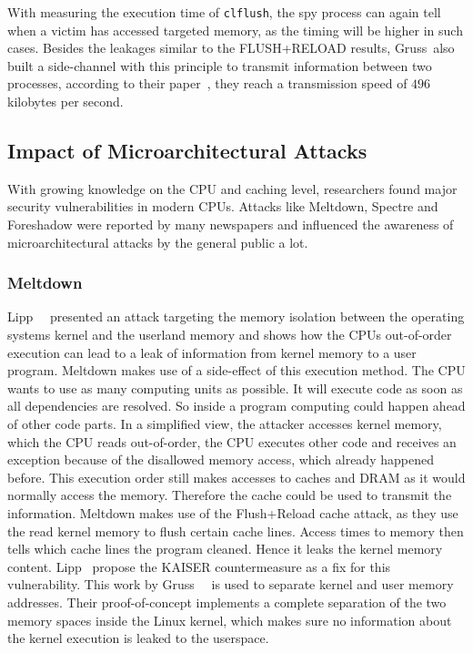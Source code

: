 With measuring the execution time of \texttt{clflush}, the spy process can again
tell when a victim has accessed targeted memory, as the timing will be higher in
such cases. Besides the leakages similar to the FLUSH+RELOAD results,
Gruss~\etal also built a side-channel with this principle to transmit
information between two processes, according to their paper~\cite{flushflush},
they reach a transmission speed of $496$ kilobytes per second.

\subsection{Impact of Microarchitectural Attacks}

With growing knowledge on the CPU and caching level, researchers found major
security vulnerabilities in modern CPUs. Attacks like Meltdown, Spectre and
Foreshadow were reported by many newspapers and influenced the awareness of
microarchitectural attacks by the general public a lot.

\subsubsection{Meltdown}

Lipp~\etal~\cite{meltdown} presented an attack targeting the memory isolation
between the operating system\textquotesingle s kernel and the userland memory
and shows how the CPU\textquotesingle s out-of-order execution can lead to a
leak of information from kernel memory to a user program. Meltdown makes use of
a side-effect of this execution method. The CPU wants to use as many computing
units as possible. It will execute code as soon as all dependencies are
resolved. So inside a program computing could happen ahead of other code parts.
In a simplified view, the attacker accesses kernel memory, which the CPU reads
out-of-order, the CPU executes other code and receives an exception because of
the disallowed memory access, which already happened before. This execution
order still makes accesses to caches and DRAM as it would normally access the
memory. Therefore the cache could be used to transmit the information. Meltdown
makes use of the Flush+Reload cache attack, as they use the read kernel memory
to flush certain cache lines. Access times to memory then tells which cache
lines the program cleaned. Hence it leaks the kernel memory content. Lipp~\etal
propose the KAISER countermeasure as a fix for this vulnerability. This work by
Gruss~\etal~\cite{kaiserpaper} is used to separate kernel and user memory
addresses. Their proof-of-concept implements a complete separation of the two
memory spaces inside the Linux kernel, which makes sure no information about the
kernel execution is leaked to the userspace.

